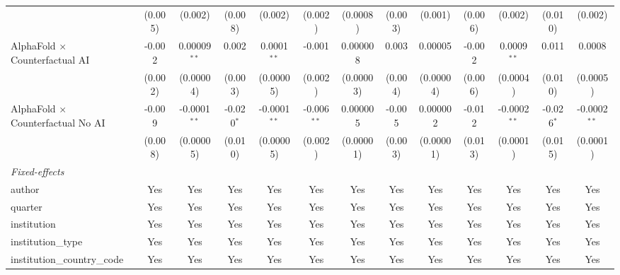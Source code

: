\begin{tabular}{lcccccccccccc}
                                            & (0.005)       & (0.002)        & (0.008)       & (0.002)        & (0.002)       & (0.0008)     & (0.003) & (0.001)       & (0.006)       & (0.002)        & (0.010)       & (0.002)\\   
   AlphaFold $\times$ Counterfactual AI     & -0.002        & 0.00009$^{**}$ & 0.002         & 0.0001$^{**}$  & -0.001        & 0.000008     & 0.003   & 0.00005       & -0.002        & 0.0009$^{**}$  & 0.011         & 0.0008\\   
                                            & (0.002)       & (0.00004)      & (0.003)       & (0.00005)      & (0.002)       & (0.00003)    & (0.004) & (0.00004)     & (0.006)       & (0.0004)       & (0.010)       & (0.0005)\\   
   AlphaFold $\times$ Counterfactual No AI  & -0.009        & -0.0001$^{**}$ & -0.020$^{*}$  & -0.0001$^{**}$ & -0.006$^{**}$ & 0.000005     & -0.005  & 0.000002      & -0.012        & -0.0002$^{**}$ & -0.026$^{*}$  & -0.0002$^{**}$\\   
                                            & (0.008)       & (0.00005)      & (0.010)       & (0.00005)      & (0.002)       & (0.00001)    & (0.003) & (0.00001)     & (0.013)       & (0.0001)       & (0.015)       & (0.0001)\\   
   \midrule
   \emph{Fixed-effects}\\
   author                                   & Yes           & Yes            & Yes           & Yes            & Yes           & Yes          & Yes     & Yes           & Yes           & Yes            & Yes           & Yes\\  
   quarter                                  & Yes           & Yes            & Yes           & Yes            & Yes           & Yes          & Yes     & Yes           & Yes           & Yes            & Yes           & Yes\\  
   institution                              & Yes           & Yes            & Yes           & Yes            & Yes           & Yes          & Yes     & Yes           & Yes           & Yes            & Yes           & Yes\\  
   institution\_type                        & Yes           & Yes            & Yes           & Yes            & Yes           & Yes          & Yes     & Yes           & Yes           & Yes            & Yes           & Yes\\  
   institution\_country\_code               & Yes           & Yes            & Yes           & Yes            & Yes           & Yes          & Yes     & Yes           & Yes           & Yes            & Yes           & Yes\\  

\end{tabular}
